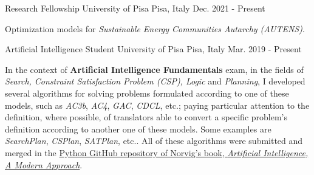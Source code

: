 

\begin{cventries}

  \cventry
    {Research Fellowship} %
    {University of Pisa} %
    {Pisa, Italy} %
    {Dec. 2021 - Present} %
    {   
      \begin{cvitems} %
        \item {Optimization models for \textit{Sustainable Energy Communities Autarchy (AUTENS)}.}
      \end{cvitems}
    }

  \cventry
    {Artificial Intelligence Student} %
    {University of Pisa} %
    {Pisa, Italy} %
    {Mar. 2019 - Present} %
    {   
      \begin{cvitems} %
        \item {In the context of \textbf{Artificial Intelligence Fundamentals} exam, in the fields of \textit{Search, Constraint Satisfaction Problem (CSP), Logic} and \textit{Planning}, I developed several algorithms for solving problems formulated according to one of these models, such as \textit{AC3b}, \textit{AC4}, \textit{GAC}, \textit{CDCL}, etc.; paying particular attention to the definition, where possible, of translators able to convert a specific problem's definition according to another one of these models. Some examples are \textit{SearchPlan}, \textit{CSPlan}, \textit{SATPlan}, etc.. All of these algorithms were submitted and merged in the \href{https://github.com/aimacode/aima-python}{Python GitHub repository of Norvig's book, \textit{Artificial Intelligence, A Modern Approach}}.}
      \end{cvitems}
    }


\end{cventries}
